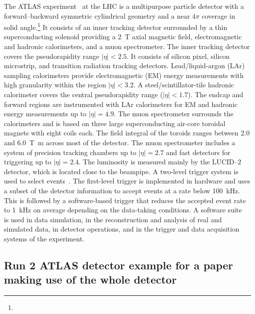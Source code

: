 The ATLAS experiment~\cite{PERF-2007-01} at the LHC is a multipurpose particle detector
with a forward--backward symmetric cylindrical geometry and a near \(4\pi\) coverage in 
solid angle.\footnote{\AtlasCoordFootnote}
It consists of an inner tracking detector surrounded by a thin superconducting solenoid
providing a \qty{2}{\tesla} axial magnetic field, electromagnetic and hadronic calorimeters, and a muon spectrometer.
The inner tracking detector covers the pseudorapidity range \(|\eta| < 2.5\).
It consists of silicon pixel, silicon microstrip, and transition radiation tracking detectors.
Lead/liquid-argon (LAr) sampling calorimeters provide electromagnetic (EM) energy measurements
with high granularity within the region \(|\eta|< 3.2\).
A steel/scintillator-tile hadronic calorimeter covers the central pseudorapidity range (\(|\eta| < 1.7\)).
The endcap and forward regions are instrumented with LAr calorimeters
for EM and hadronic energy measurements up to \(|\eta| = 4.9\).
The muon spectrometer surrounds the calorimeters and is based on
three large superconducting air-core toroidal magnets with eight coils each.
The field integral of the toroids ranges between \num{2.0} and \qty{6.0}{\tesla\metre}
across most of the detector. 
The muon spectrometer includes a system of precision tracking chambers up to \(|\eta| = 2.7\) and fast detectors for triggering up to \(|\eta| = 2.4\).
The luminosity is measured mainly by the LUCID--2~\cite{LUCID2} detector, which is located close to the beampipe.
A two-level trigger system is used to select events~\cite{TRIG-2016-01}. 
The first-level trigger is implemented in hardware and uses a subset of the detector information
to accept events at a rate below \qty{100}{\kHz}.
This is followed by a software-based trigger that
reduces the accepted event rate to \qty{1}{\kHz} on average
depending on the data-taking conditions.
A software suite~\cite{ATL-SOFT-PUB-2021-001} is used in data simulation, in the reconstruction
and analysis of real and simulated data, in detector operations, and in the trigger and data acquisition
systems of the experiment.


\subsection{Run 2 ATLAS detector example for a paper making use of the whole detector}
\label{sec:atlas2b}

